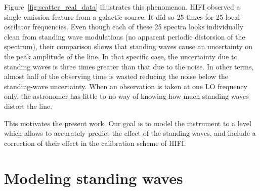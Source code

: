 \documentclass[a4paper,11pt]{article}
\begin{document}
Figure~\ref{fig:scatter_real_data} illustrates this phenomenon.
HIFI observed a single emission feature from a galactic source.
It did so 25 times for 25 local oscilator frequencies.
Even though each of these 25 spectra looks individually clean from standing wave modulations (no apparent periodic distorsion of the spectrum), their comparison shows that standing waves cause an uncertainty on the peak amplitude of the line.
In that specific case, the uncertainty due to standing waves is three times greater than that due to the noise.
In other terms, almost half of the observing time is wasted reducing the noise below the standing-wave uncertainty.
When an observation is taken at one LO frequency only, the astronomer has little to no way of knowing how much standing waves distort the line.

This motivates the present work.
Our goal is to model the instrument to a level which allows to accurately predict the effect of the standing waves, and include a correction of their effect in the calibration scheme of HIFI.






\section{Modeling standing waves}



\end{document}
